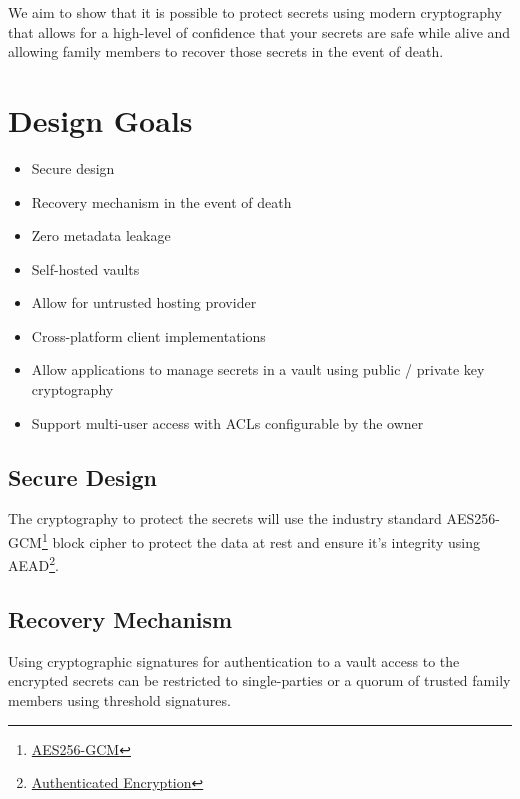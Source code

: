 \documentclass[a4paper,titlepage,oneside]{article}
\renewcommand{\paragraph}{\small}
\begin{document}
\paragraph{We aim to show that it is possible to protect secrets using modern cryptography that allows for a high-level of confidence that your secrets are safe while alive and allowing family members to recover those secrets in the event of death.}

\section{Design Goals}

\begin{itemize}
  \item Secure design
  \item Recovery mechanism in the event of death
  \item Zero metadata leakage
  \item Self-hosted vaults
  \item Allow for untrusted hosting provider
  \item Cross-platform client implementations
  \item Allow applications to manage secrets in a vault using public / private key cryptography
  \item Support multi-user access with ACLs configurable by the owner
\end{itemize}

\subsection{Secure Design}

\paragraph{The cryptography to protect the secrets will use the industry standard AES256-GCM\footnote{\href{https://doc.libsodium.org/secret-key_cryptography/aead/aes-256-gcm}{AES256-GCM}} block cipher to protect the data at rest and ensure it's integrity using AEAD\footnote{\href{https://en.wikipedia.org/wiki/Authenticated_encryption}{Authenticated Encryption}}.}

\subsection{Recovery Mechanism}

\paragraph{Using cryptographic signatures for authentication to a vault access to the encrypted secrets can be restricted to single-parties or a quorum of trusted family members using threshold signatures.}
\end{document}
